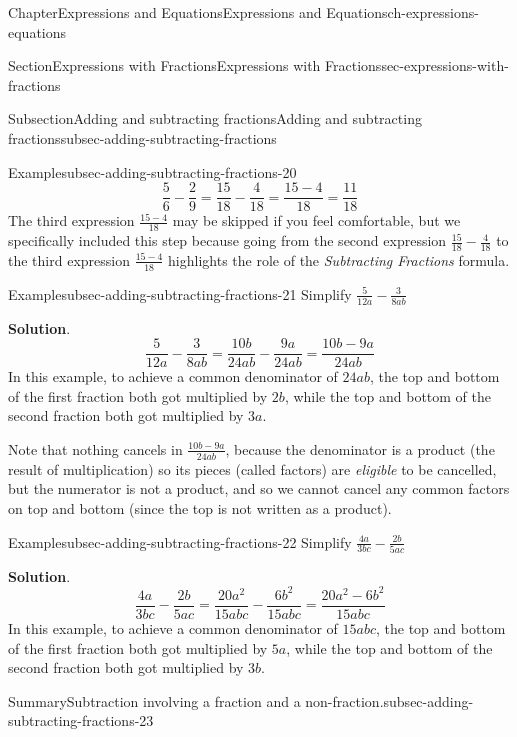 \documentclass[twoside,11pt,]{book}
\newcommand{\blocktitlefont}{\relax}
\numberwithin{equation}{chapter}
\begin{document}
\begin{chapterptx}{Chapter}{Expressions and Equations}{}{Expressions and Equations}{}{}{ch-expressions-equations}
\begin{sectionptx}{Section}{Expressions with Fractions}{}{Expressions with Fractions}{}{}{sec-expressions-with-fractions}
\begin{subsectionptx}{Subsection}{Adding and subtracting fractions}{}{Adding and subtracting fractions}{}{}{subsec-adding-subtracting-fractions}
\begin{example}{Example}{}{subsec-adding-subtracting-fractions-20}
\begin{equation*}
\frac56 - \frac29 = \frac{15}{18} - \frac{4}{18} = \frac{15-4}{18} = \frac{11}{18}
\end{equation*}
The third expression \(\frac{15-4}{18}\) may be skipped if you feel comfortable, but we specifically included this step because going from the second expression \(\frac{15}{18}-\frac{4}{18}\) to the third expression \(\frac{15-4}{18}\) highlights the role of the \emph{Subtracting Fractions} formula.%
\end{example}
\begin{example}{Example}{}{subsec-adding-subtracting-fractions-21}%
Simplify \(\frac{5}{12a} - \frac{3}{8ab}\)%
\par\smallskip%
\noindent\textbf{\blocktitlefont Solution}.\hypertarget{subsec-adding-subtracting-fractions-21-2}{}\quad{}%
\begin{equation*}
\frac{5}{12a} - \frac{3}{8ab} = \frac{10b}{24ab} - \frac{9a}{24ab} = \frac{10b-9a}{24ab}
\end{equation*}
In this example, to achieve a common denominator of \(24ab\), the top and bottom of the first fraction both got multiplied by \(2b\), while the top and bottom of the second fraction both got multiplied by \(3a\).%
\par
Note that nothing cancels in \(\frac{10b-9a}{24ab}\), because the denominator is a product (the result of multiplication) so its pieces (called factors) are \emph{eligible} to be cancelled, but the numerator is not a product, and so we cannot cancel any common factors on top and bottom (since the top is not written as a product).%
\end{example}
\begin{example}{Example}{}{subsec-adding-subtracting-fractions-22}%
Simplify \(\frac{4a}{3bc} - \frac{2b}{5ac}\)%
\par\smallskip%
\noindent\textbf{\blocktitlefont Solution}.\hypertarget{subsec-adding-subtracting-fractions-22-2}{}\quad{}%
\begin{equation*}
\frac{4a}{3bc} - \frac{2b}{5ac} = \frac{20a^2}{15abc} - \frac{6b^2}{15abc} = \frac{20a^2 - 6b^2}{15abc}
\end{equation*}
In this example, to achieve a common denominator of \(15abc\), the top and bottom of the first fraction both got multiplied by \(5a\), while the top and bottom of the second fraction both got multiplied by \(3b\).%
\end{example}
\begin{assemblage}{Summary}{Subtraction involving a fraction and a non-fraction.}{subsec-adding-subtracting-fractions-23}%

\end{assemblage}
\end{subsectionptx}
\end{sectionptx}
\end{chapterptx}
\end{document}
